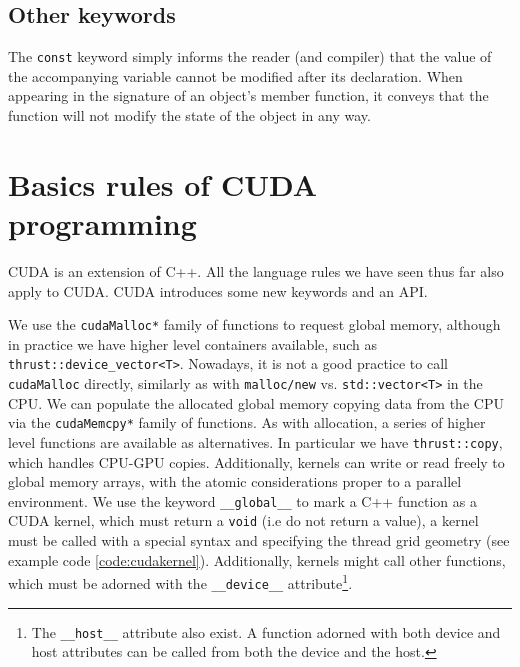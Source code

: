 \documentclass[ twoside,openright,titlepage,numbers=noenddot,%
headinclude,footinclude,cleardoublepage=empty,abstract=on,
BCOR=5mm,paper=a4,fontsize=11pt, dvipsnames
]{scrreprt}
\def\ucpp{uammd_cpp_lexer.py:UAMMDCppLexer -x}
\newcommand{\gpu}{\gls{GPU}\xspace}
\begin{document}
\subsection*{Other keywords}
The \texttt{const} keyword simply informs the reader (and compiler) that the value of the accompanying variable cannot be modified after its declaration. When appearing in the signature of an object's member function, it conveys that the function will not modify the state of the object in any way.

\section{Basics rules of CUDA programming}
CUDA is an extension of C++. All the language rules we have seen thus far also apply to CUDA. CUDA introduces some new keywords and an \gls{API}.

We use the \texttt{cudaMalloc*} family of functions to request global memory, although in practice we have higher level containers available, such as \texttt{thrust::device_vector<T>}. Nowadays, it is not a good practice to call \texttt{cudaMalloc} directly, similarly as with \texttt{malloc/new} vs. \texttt{std::vector<T>} in the CPU.
We can populate the allocated global memory copying data from the CPU via the \texttt{cudaMemcpy*} family of functions. As with allocation, a series of higher level functions are available as alternatives. In particular we have \texttt{thrust::copy}, which handles CPU-\gpu copies. Additionally, kernels can write or read freely to global memory arrays, with the atomic considerations proper to a parallel environment.
We use the keyword \texttt{__global__} to mark a C++ function as a CUDA kernel, which must return a \texttt{void} (i.e do not return a value), a kernel must be called with a special syntax and specifying the thread grid geometry (see example code \ref{code:cudakernel}).
Additionally, kernels might call other functions, which must be adorned with the \texttt{__device__} attribute\footnote{The \texttt{__host__} attribute also exist. A function adorned with both device and host attributes can be called from both the device and the host.}.
\end{document}

